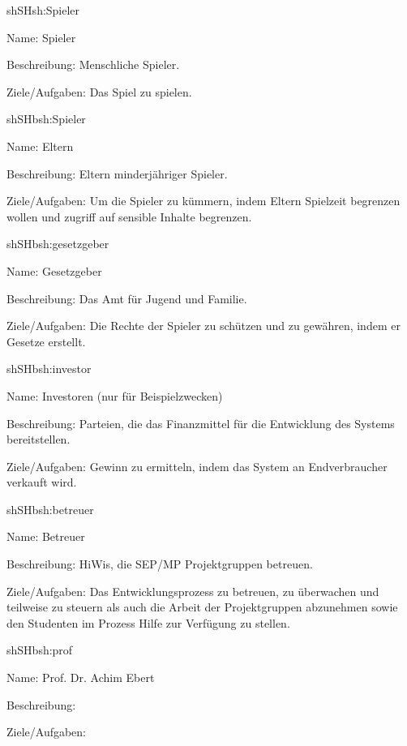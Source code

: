\begin{description}[leftmargin=5em, style=sameline]
	
	\begin{lhp}{sh}{SH}{sh:Spieler}
		\item [Name:] Spieler
		\item [Beschreibung:] Menschliche Spieler.
		\item [Ziele/Aufgaben:] Das Spiel zu spielen.
	\end{lhp}
	
	\begin{lhp}{sh}{SH}{bsh:Spieler}
		\item [Name:] Eltern
		\item [Beschreibung:] Eltern minderjähriger Spieler.
		\item [Ziele/Aufgaben:] Um die Spieler zu kümmern, indem Eltern Spielzeit begrenzen wollen und zugriff auf sensible Inhalte begrenzen.
	\end{lhp}
	
	\begin{lhp}{sh}{SH}{bsh:gesetzgeber}
		\item [Name:] Gesetzgeber
		\item [Beschreibung:] Das Amt für Jugend und Familie.
		\item [Ziele/Aufgaben:] Die Rechte der Spieler zu schützen und zu gewähren, indem er Gesetze erstellt.
	\end{lhp}
	
	\begin{lhp}{sh}{SH}{bsh:investor}
		\item [Name:] Investoren (nur für Beispielzwecken)
		\item [Beschreibung:] Parteien, die das Finanzmittel für die Entwicklung des Systems bereitstellen.
		\item [Ziele/Aufgaben:] Gewinn zu ermitteln, indem das System an Endverbraucher verkauft wird.
	\end{lhp}
	
	\begin{lhp}{sh}{SH}{bsh:betreuer}
		\item [Name:] Betreuer
		\item [Beschreibung:] HiWis, die SEP/MP Projektgruppen betreuen.
		\item [Ziele/Aufgaben:] Das Entwicklungsprozess zu betreuen, zu überwachen und teilweise zu steuern als auch die Arbeit der Projektgruppen abzunehmen sowie den Studenten im Prozess Hilfe zur Verfügung zu stellen. 
	\end{lhp}
	
	\begin{lhp}{sh}{SH}{bsh:prof}
		\item [Name:] Prof. Dr. Achim Ebert
		\item [Beschreibung:] 
		\item [Ziele/Aufgaben:]  
	\end{lhp}
		
\end{description}


